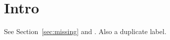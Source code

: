 \documentclass{article}
\begin{document}
\section{Intro}\label{sec:intro}
See Section~\ref{sec:missing} and \cite{nobody2020}.
Also a duplicate label.
\label{sec:intro}
\end{document}
